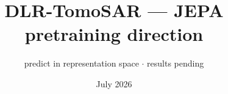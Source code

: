 \documentclass[aspectratio=169,9pt]{beamer}
\title{\textbf{DLR-TomoSAR --- JEPA pretraining direction}}
\subtitle{predict in representation space \; $\cdot$ \; \textcolor{soft}{results pending}}
\date{\small July 2026}
\author{}
\begin{document}
\begin{frame}[plain]
  \titlepage
\end{frame}


\end{document}
